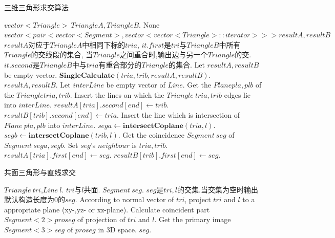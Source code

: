 \documentclass[a4paper]{book}
\renewcommand{\algorithmicrequire}{\textbf{输入:}}
\renewcommand{\algorithmicensure}{\textbf{输出:}}
\renewcommand{\algorithmicrequire}{\textbf{Input : }}
\renewcommand{\algorithmicrequire}{\textbf{Precondition : }}
\renewcommand{\algorithmicensure}{\textbf{Output : }}
\renewcommand{\algorithmicensure}{\textbf{Postcondition : }}
\numberwithin{equation}{chapter}
\theoremstyle{definition}
\begin{document}
\begin{algorithm}
	\caption{三维三角形求交算法}
	\begin{algorithmic}[1]
		\renewcommand{\algorithmicrequire}{\textbf{Input : }}
		\Require $vector< Triangle >\ TriangleA,TriangleB$.
		\renewcommand{\algorithmicrequire}{\textbf{Precondition : }}
		\Require None
		\renewcommand{\algorithmicensure}{\textbf{Output : }}
		\Ensure $ vector<pair<vector<Segment>,
		vector<vector<Triangle>::iterator>>> resultA,resultB$ 
		\renewcommand{\algorithmicensure}{\textbf{Postcondition : }}
		\Ensure $resultA$对应于$TriangleA$中相同下标的$tria$,
		$it.first$是$tri$与$TriangleB$中所有$Triangle$的交线段的集合,
		当$Triangle$之间重合时,输出边与另一个$Triangle$的交.
		$it.second$是$TriangleB$中与$tria$有重合部分的$Triangle$的集合.
		\State Let $resultA,resultB$ be empty vector.
		\State $\textbf{SingleCalculate}(tria,trib,resultA,resultB)$.
		\EndFor
		\EndFor
		\State \Return $resultA,resultB$.
		\EndFunction
		\State
		\State Let $interLine$ be empty vector of $Line$.
		\State Get the $Plane pla,plb$ of the $Triangle tria,trib$.
		\State Insert the lines on which the $Triangle\ tria,trib$ edges lie into $interLine$.
		\State $resultA[tria].second[end] \gets trib$.
		\State $resultB[trib].second[end] \gets tria$.
		\Else
		\State Insert the line which is intersection of $Plane\ pla,plb$ into $interLine$.
		\EndIf
		\State $sega \gets \textbf{intersectCoplane}(tria,l)$.
		\State $segb \gets \textbf{intersectCoplane}(trib,l)$.
		\State Get  the coincidence $Segment\ seg$ of $Segment\ sega,segb$.
		\State Set $seg$'s $neighbour$ is $tria,trib$. 
		\State $resultA[tria].first[end] \gets seg$.
		\State $resultB[trib].first[end] \gets seg$.
		\EndIf
		\EndFor
		\State \Return
		\EndFunction
	\end{algorithmic}
\end{algorithm}

\begin{algorithm}
	\caption{共面三角形与直线求交}
	\begin{algorithmic}[1]
		\renewcommand{\algorithmicrequire}{\textbf{Input : }}
		\Require $Triangle\ tri$,$Line\ l$.
		\renewcommand{\algorithmicrequire}{\textbf{Precondition : }}
		\Require $tri$与$l$共面.
		\renewcommand{\algorithmicensure}{\textbf{Output : }}
		\Ensure $Segment\ seg$.
		\renewcommand{\algorithmicensure}{\textbf{Postcondition : }}
		\Ensure $seg$是$tri,l$的交集.当交集为空时输出默认构造长度为0的$seg$.
		\State According to normal vector of $tri$, project $tri$ and $l$ to a appropriate plane
		(xy-,yz- or xz-plane).
		\State Calculate coincident part $Segment<2> proseg$ of projection of $tri$ and $l$.
		\State Get the primary image $Segment<3> seg$ of $proseg$ in 3D space.
		\State \Return $seg$.
		\EndFunction
	\end{algorithmic}
\end{algorithm}
\end{document}
